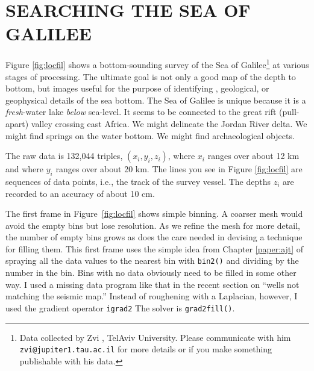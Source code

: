 \section{SEARCHING THE SEA OF GALILEE}
Figure \ref{fig:locfil} shows a bottom-sounding survey
of the Sea of Galilee\footnote{
        Data collected by Zvi , TelAviv University.
        Please communicate with him {\tt zvi@jupiter1.tau.ac.il}
        for more details or if you make something
        publishable with his data.
        }
at various stages of processing.
The ultimate goal is not only a good map of
the depth to bottom,
but images useful for the purpose
of identifying , geological, or
geophysical details of the sea bottom.
The Sea of Galilee is unique
because it is a {\it fresh}-water lake {\it below} sea-level.
It seems to be connected to the great rift (pull-apart)
valley crossing east Africa.
We might delineate the Jordan River delta.
We might find springs on the water bottom.
We might find archaeological objects.
\par
{}
The raw data is 132,044 triples, $(x_i,y_i,z_i)$,
where $x_i$ ranges over about 12 km and
where $y_i$ ranges over about 20 km.
The lines you see in Figure \ref{fig:locfil}
are sequences of data points, i.e., the track of the survey vessel.
The depths $z_i$ are recorded to an accuracy of about 10 cm.
\par
The first frame in Figure~\ref{fig:locfil} shows simple binning.
A coarser mesh would avoid the empty bins but lose resolution.
As we refine the mesh for more detail,
the number of empty bins grows
as does the care needed in devising a technique
for filling them.
This first frame uses the simple idea from Chapter \ref{paper:ajt} of
spraying all the data values to the nearest bin
with \texttt{bin2()} 
and dividing by the number in the bin.
Bins with no data obviously need to be filled in some other way.
I used a missing data program like that in the recent section
on ``wells not matching the seismic map.''
Instead of roughening with a Laplacian, however,
I used the gradient operator \texttt{igrad2} 
The solver is \texttt{grad2fill()}.

